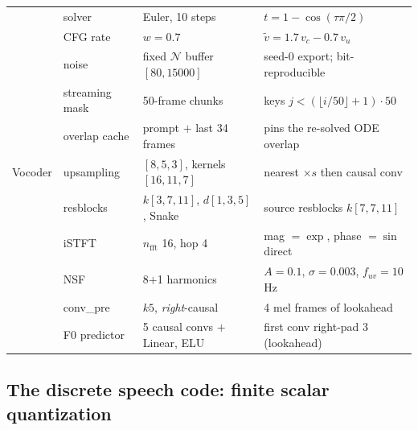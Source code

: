 \documentclass[11pt,a4paper]{article}
\begin{document}
\begin{table}[htbp]
\begin{tabular}{@{}llll@{}}
 & solver & Euler, 10 steps & $t = 1-\cos(\tau\pi/2)$ \\
 & CFG rate & $w = 0.7$ & $\tilde v = 1.7\,v_c - 0.7\,v_u$ \\
 & noise & fixed $\mathcal{N}$ buffer $[80,15000]$ & seed-0 export; bit-reproducible \\
 & streaming mask & 50-frame chunks & keys $j < (\lfloor i/50\rfloor{+}1)\cdot 50$ \\
 & overlap cache & prompt $+$ last 34 frames & pins the re-solved ODE overlap \\
\midrule
Vocoder & upsampling & $[8,5,3]$, kernels $[16,11,7]$ & nearest $\times s$ then causal conv \\
 & resblocks & $k[3,7,11]$, $d[1,3,5]$, Snake & source resblocks $k[7,7,11]$ \\
 & iSTFT & $n_{\mathrm{fft}}$ 16, hop 4 & mag $=\exp$, phase $=\sin$ direct \\
 & NSF & 8$+$1 harmonics & $A{=}0.1$, $\sigma{=}0.003$, $f_{uv}{=}10$\,Hz \\
 & conv\_pre & $k5$, \emph{right}-causal & 4 mel frames of lookahead \\
 & F0 predictor & 5 causal convs $+$ Linear, ELU & first conv right-pad 3 (lookahead) \\
\bottomrule
\end{tabular}
\end{table}

\subsection{The discrete speech code: finite scalar quantization}
\label{sec:fsq}
\end{document}
